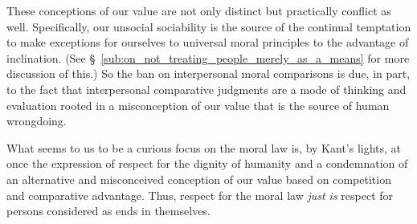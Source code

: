 \documentclass[12pt]{article}
\begin{document}
These conceptions of our value are not only distinct but practically conflict as well. Specifically, our unsocial sociability is the source of the continual temptation to make exceptions for ourselves to universal moral principles to the advantage of inclination. (See \S~\ref{sub:on_not_treating_people_merely_as_a_means} for more discussion of this.) So the ban on interpersonal moral comparisons is due, in part, to the fact that interpersonal comparative judgments are a mode of thinking and evaluation rooted in a misconception of our value that is the source of human wrongdoing.

What seems to us to be a curious focus on the moral law is, by Kant's lights, at once the expression of respect for the dignity of humanity and a condemnation of an alternative and misconceived conception of our value based on competition and comparative advantage. Thus, respect for the moral law \emph{just is} respect for persons considered as ends in themselves.
\end{document}
